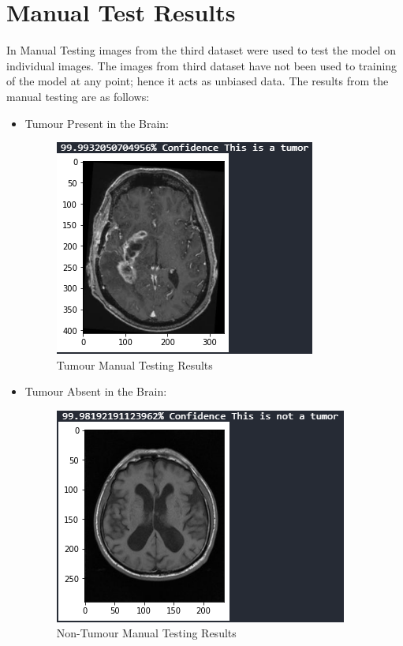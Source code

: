 \section{Manual Test Results}
In Manual Testing images from the third dataset were used to test the model on individual images. The images from third dataset have not been used to training of the model at any point; hence it acts as unbiased data. The results from the manual testing are as follows:
\begin{itemize}
    \item Tumour Present in the Brain:
        \begin{figure}[H]
        \includegraphics[scale=0.8]{Photos/Tumor_Manual_Result.PNG}
        \caption{Tumour Manual Testing Results} \label{fig:ishan}
        \end{figure}
    \item Tumour Absent in the Brain:
        \begin{figure}[H]
        \includegraphics[scale=0.8]{Photos/Non_Tumor_Manual_Result.PNG}
        \caption{Non-Tumour Manual Testing Results} \label{fig:ishan}
        \end{figure}
\end{itemize}